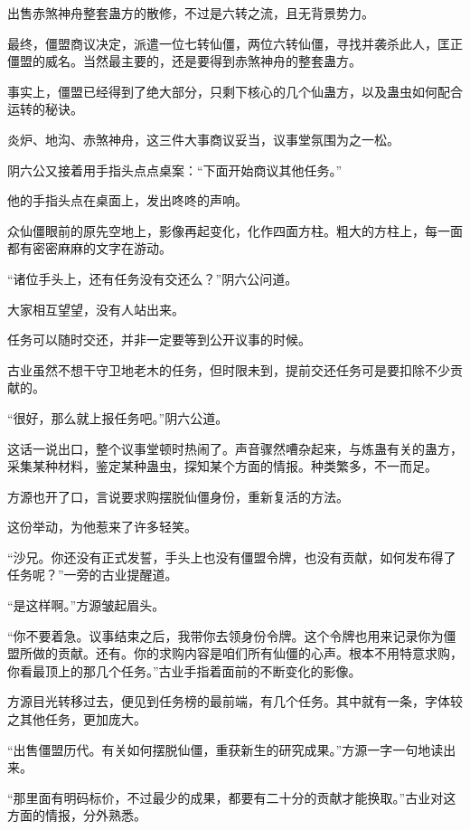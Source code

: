 
\begin{this_body}

出售赤煞神舟整套蛊方的散修，不过是六转之流，且无背景势力。

最终，僵盟商议决定，派遣一位七转仙僵，两位六转仙僵，寻找并袭杀此人，匡正僵盟的威名。当然最主要的，还是要得到赤煞神舟的整套蛊方。

事实上，僵盟已经得到了绝大部分，只剩下核心的几个仙蛊方，以及蛊虫如何配合运转的秘诀。

炎炉、地沟、赤煞神舟，这三件大事商议妥当，议事堂氛围为之一松。

阴六公又接着用手指头点点桌案：“下面开始商议其他任务。”

他的手指头点在桌面上，发出咚咚的声响。

众仙僵眼前的原先空地上，影像再起变化，化作四面方柱。粗大的方柱上，每一面都有密密麻麻的文字在游动。

“诸位手头上，还有任务没有交还么？”阴六公问道。

大家相互望望，没有人站出来。

任务可以随时交还，并非一定要等到公开议事的时候。

古业虽然不想干守卫地老木的任务，但时限未到，提前交还任务可是要扣除不少贡献的。

“很好，那么就上报任务吧。”阴六公道。

这话一说出口，整个议事堂顿时热闹了。声音骤然嘈杂起来，与炼蛊有关的蛊方，采集某种材料，鉴定某种蛊虫，探知某个方面的情报。种类繁多，不一而足。

方源也开了口，言说要求购摆脱仙僵身份，重新复活的方法。

这份举动，为他惹来了许多轻笑。

“沙兄。你还没有正式发誓，手头上也没有僵盟令牌，也没有贡献，如何发布得了任务呢？”一旁的古业提醒道。

“是这样啊。”方源皱起眉头。

“你不要着急。议事结束之后，我带你去领身份令牌。这个令牌也用来记录你为僵盟所做的贡献。还有。你的求购内容是咱们所有仙僵的心声。根本不用特意求购，你看最顶上的那几个任务。”古业手指着面前的不断变化的影像。

方源目光转移过去，便见到任务榜的最前端，有几个任务。其中就有一条，字体较之其他任务，更加庞大。

“出售僵盟历代。有关如何摆脱仙僵，重获新生的研究成果。”方源一字一句地读出来。

“那里面有明码标价，不过最少的成果，都要有二十分的贡献才能换取。”古业对这方面的情报，分外熟悉。


\end{this_body}
